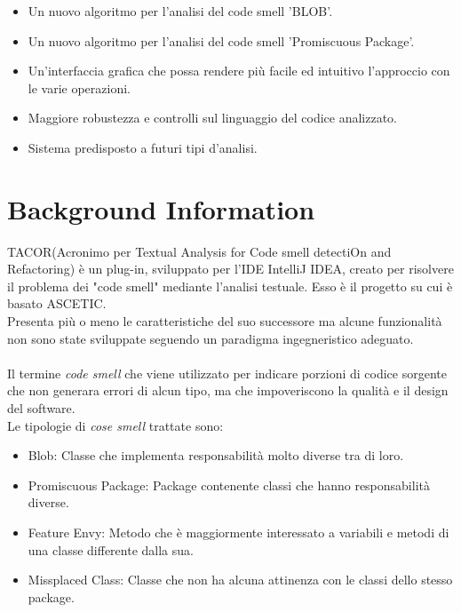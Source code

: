 	\begin{itemize}
		
		\item  Un nuovo algoritmo per l'analisi del code smell 'BLOB'.
		
		\item  Un nuovo algoritmo per l'analisi del code smell 'Promiscuous Package'.
		
		\item  Un'interfaccia grafica che possa rendere più facile ed intuitivo l'approccio con le varie operazioni.
		
		\item  Maggiore robustezza e controlli sul linguaggio del codice analizzato.
		
		\item  Sistema predisposto a futuri tipi d'analisi.
		
	\end{itemize}

	\section{Background Information}
	
	TACOR(Acronimo per Textual Analysis for Code smell detectiOn and Refactoring) è un plug-in, sviluppato per l'IDE IntelliJ IDEA, creato per risolvere il problema dei "code smell" mediante l'analisi testuale. Esso è il progetto su cui è basato ASCETIC.\\
	Presenta più o meno le caratteristiche del suo successore ma alcune funzionalità non sono state sviluppate seguendo un paradigma ingegneristico adeguato.\\\\
	Il termine \textit{code smell} che viene utilizzato per indicare porzioni di codice sorgente che non generara errori di alcun tipo, ma che impoveriscono la qualità e il design del software.\\
	Le tipologie di \textit{cose smell} trattate sono:
	
	\begin{itemize}
		
		\item Blob: Classe che implementa responsabilità molto diverse tra di loro.
		\item Promiscuous Package: Package contenente classi che hanno responsabilità diverse.
		\item Feature Envy: Metodo che è maggiormente interessato a variabili e metodi di una classe differente dalla sua.
		\item Missplaced Class: Classe che non ha alcuna attinenza con le classi dello stesso package.
	\end{itemize}
			
